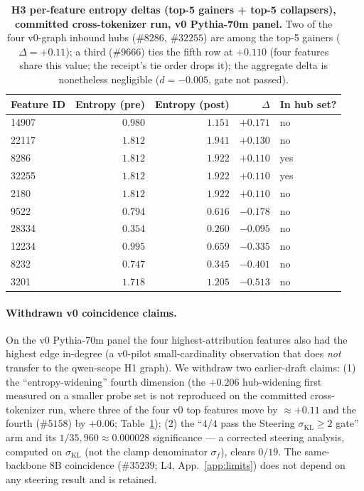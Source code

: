 \documentclass{article}
\begin{document}
\begin{table}[h]
\centering
\caption{\textbf{H3 per-feature entropy deltas (top-5 gainers + top-5 collapsers), committed cross-tokenizer run, v0 Pythia-70m panel.} Two of the four v0-graph inbound hubs ($\#8286$, $\#32255$) are among the top-5 gainers ($\Delta=+0.11$); a third ($\#9666$) ties the fifth row at $+0.110$ (four features share this value; the receipt's tie order drops it); the aggregate delta is nonetheless negligible ($d=-0.005$, gate not passed).}
\label{tab:h3_delta}
\small
\begin{tabular}{lrrrl}
\toprule
Feature ID & Entropy (pre) & Entropy (post) & $\Delta$ & In hub set? \\
\midrule
14907 & $0.980$ & $1.151$ & $+0.171$ & no \\
22117 & $1.812$ & $1.941$ & $+0.130$ & no \\
8286  & $1.812$ & $1.922$ & $+0.110$ & yes \\
32255 & $1.812$ & $1.922$ & $+0.110$ & yes \\
2180  & $1.812$ & $1.922$ & $+0.110$ & no \\
\midrule
9522  & $0.794$ & $0.616$ & $-0.178$ & no \\
28334 & $0.354$ & $0.260$ & $-0.095$ & no \\
12234 & $0.995$ & $0.659$ & $-0.335$ & no \\
8232  & $0.747$ & $0.345$ & $-0.401$ & no \\
3201  & $1.718$ & $1.205$ & $-0.513$ & no \\
\bottomrule
\end{tabular}
\end{table}

\paragraph{Withdrawn v0 coincidence claims.} On the v0 Pythia-70m panel the four highest-attribution features also had the highest edge in-degree (a v0-pilot small-cardinality observation that does \emph{not} transfer to the qwen-scope H1 graph). We withdraw two earlier-draft claims: (1) the ``entropy-widening'' fourth dimension (the $+0.206$ hub-widening first measured on a smaller probe set is not reproduced on the committed cross-tokenizer run, where three of the four v0 top features move by $\approx+0.11$ and the fourth ($\#5158$) by $+0.06$; Table~\ref{tab:h3_delta}); (2) the ``$4/4$ pass the Steering $\sigma_{\text{KL}}\geq2$ gate'' arm and its $1/35{,}960\approx0.000028$ significance --- a corrected steering analysis, computed on $\sigma_{\text{KL}}$ (not the clamp denominator $\sigma_f$), clears $0/19$. The same-backbone 8B coincidence ($\#35239$; L4, App.~\ref{app:limits}) does not depend on any steering result and is retained.
\end{document}
